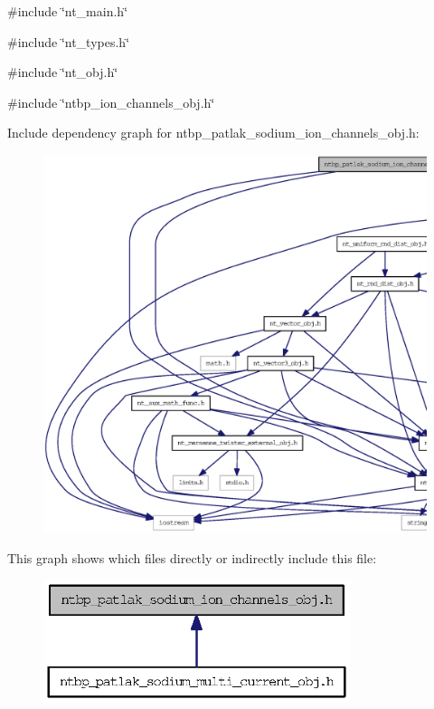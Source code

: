 {\ttfamily \#include \char`\"{}nt\_\-main.h\char`\"{}}\par
{\ttfamily \#include \char`\"{}nt\_\-types.h\char`\"{}}\par
{\ttfamily \#include \char`\"{}nt\_\-obj.h\char`\"{}}\par
{\ttfamily \#include \char`\"{}ntbp\_\-ion\_\-channels\_\-obj.h\char`\"{}}\par
Include dependency graph for ntbp\_\-patlak\_\-sodium\_\-ion\_\-channels\_\-obj.h:
\nopagebreak
\begin{figure}[H]
\begin{center}
\leavevmode
\includegraphics[width=400pt]{ntbp__patlak__sodium__ion__channels__obj_8h__incl}
\end{center}
\end{figure}
This graph shows which files directly or indirectly include this file:
\nopagebreak
\begin{figure}[H]
\begin{center}
\leavevmode
\includegraphics[width=254pt]{ntbp__patlak__sodium__ion__channels__obj_8h__dep__incl}
\end{center}
\end{figure}

